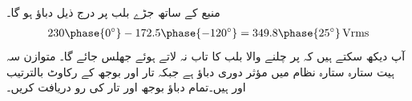 منبع  کے ساتھ جڑے بلب پر درج ذیل دباؤ ہو گا۔
\begin{align*}
230\phase{0^{\circ}}-172.5\phase{-120^{\circ}}=349.8\phase{25^{\circ}}\,\si{\volt\rms}
\end{align*}
آپ دیکھ سکتے ہیں کہ  پر چلنے والا بلب  کا تاب نہ لاتے ہوئے جھلس جائے گا۔
متوازن سہ ہیت ستارہ ستارہ  نظام میں مؤثر دوری دباؤ  ہے جبکہ تار اور بوجھ کے رکاوٹ بالترتیب  اور   ہیں۔تمام دباؤ بوجھ اور تار کی رو دریافت کریں۔

